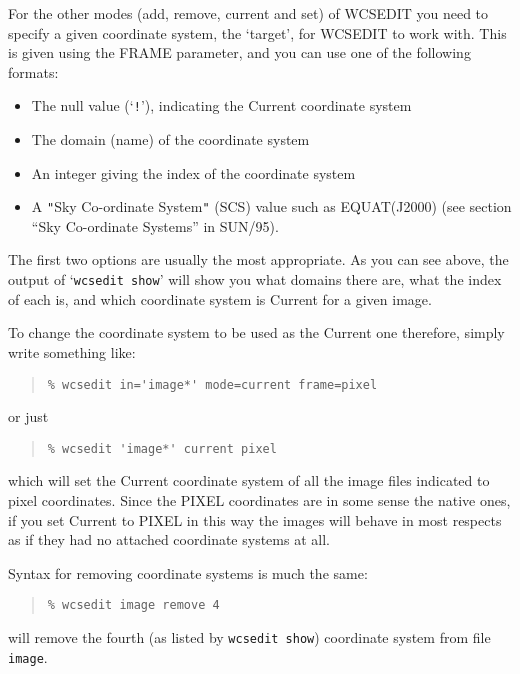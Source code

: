 \documentclass[twoside,11pt]{article}
\newcommand{\latexhtml}[2]{#1}
\newcommand{\xref}[3]{#1}
\renewcommand{\_}{\texttt{\symbol{95}}}
\newcommand{\ttsize}{\latexhtml{\small}{}}
\newenvironment{myquote}{\begin{quote}\ttsize}{\end{quote}}
\newcommand{\qt}[1]{{\tt "}#1{\tt "}}
\newcommand{\routine}[1]{{\sc #1}}
\begin{document}
For the other modes (add, remove, current and set) of \routine{WCSEDIT}
you need to specify a given coordinate system,
the `target', for \routine{WCSEDIT} to work with.
This is given using the FRAME parameter, and you can use one
of the following formats:
\begin{itemize}
\item
The null value (`{\tt !}'), indicating the Current coordinate system
\item
The domain (name) of the coordinate system
\item
An integer giving the index of the coordinate system
\item
A \qt{Sky Co-ordinate System} (SCS) value such as EQUAT(J2000)
(see section ``\xref{Sky Co-ordinate Systems}{sun95}{se_scs}'' in 
\xref{SUN/95}{sun95}{}).
\end{itemize}
The first two options are usually the most appropriate.
As you can see above, the output of `{\tt wcsedit show}' 
will show you what domains there are, what the index of each is, 
and which coordinate system is Current for a given image.

To change the coordinate system to be used as the Current one
therefore, simply write something like:
\begin{myquote}
\begin{verbatim}
% wcsedit in='image*' mode=current frame=pixel
\end{verbatim}
\end{myquote}
or just
\begin{myquote}
\begin{verbatim}
% wcsedit 'image*' current pixel
\end{verbatim}
\end{myquote}
which will set the Current coordinate system of all the image files
indicated to pixel coordinates.
Since the PIXEL coordinates are in some sense the native ones,
if you set Current to PIXEL in this way
the images will behave in most respects as if they had no attached
coordinate systems at all.

Syntax for removing coordinate systems is much the same:
\begin{myquote}
\begin{verbatim}
% wcsedit image remove 4
\end{verbatim}
\end{myquote}
will remove the fourth (as listed by {\tt wcsedit show}) coordinate
system from file {\tt image}.
\end{document}
